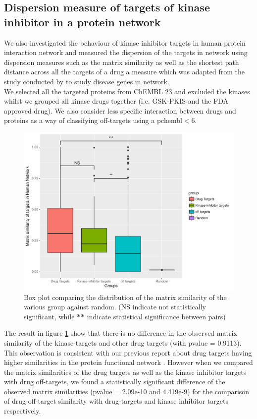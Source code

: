 \documentclass[a4paper, 11pt]{article}
\begin{document}
\subsection*{Dispersion measure of targets of kinase inhibitor in a protein network}
We also investigated the behaviour of kinase inhibitor targets in human protein interaction network and measured the dispersion of the targets in network using dispersion measures such as the matrix similarity as well as the shortest path distance across all the targets of a drug a measure which was adapted from the study conducted by \cite{menche2015uncovering} to study disease genes in network.\\
We selected all the targeted proteins from ChEMBL 23 and excluded the kinases whilst we grouped all kinase drugs together (i.e. GSK-PKIS and the FDA approved drug). We also consider less specific interaction between drugs and proteins as a way of classifying off-targets using a pchembl$<$6.
\begin{figure}[H]
	\includegraphics[width=\linewidth]{figures/simplotk.pdf}
	\centering
	\caption{Box plot comparing the distribution of the matrix similarity of the various group against random. (NS indicate not statistically significant, while \textbf{**} indicate statistical significance between pairs)}
		\label{ksim_targets}
\end{figure}
The result in figure \ref{ksim_targets} show that there is no difference in the observed matrix similarity of the kinase-targets and other drug targets (with pvalue = 0.9113). This observation is consistent with our previous report about drug targets having higher similarities in the protein functional network \cite{moya2017structural}. However when we compared the matrix similarities of the drug targets as well as the kinase inhibitor targets with drug off-targets, we found a statistically significant difference of the observed matrix similarities (pvalue = 2.09e-10 and 4.419e-9) for the comparison of drug off-target similarity with drug-targets and kinase inhibitor targets respectively.\par
\end{document}
